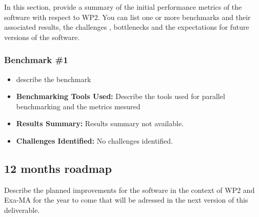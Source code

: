 In this section, provide a summary of the initial performance metrics of the software with respect to WP2.
You can list one or more benchmarks and their associated results, the challenges , bottlenecks and the expectations for future versions of the software.



\subsubsection{Benchmark \#1}
\begin{itemize}
    \item describe the benchmark
    \item \textbf{Benchmarking Tools Used:} Describe the tools used for parallel benchmarking and the metrics mesured
    \item \textbf{Results Summary:} Results summary not available.
    \item \textbf{Challenges Identified:} No challenges identified.
\end{itemize}

\subsection{12 months roadmap}
\label{sec:WP2:Scimba:roadmap}

Describe the planned improvements  for the software in the context of WP2 and Exa-MA for the year to come that will be adressed in the next version of this deliverable.